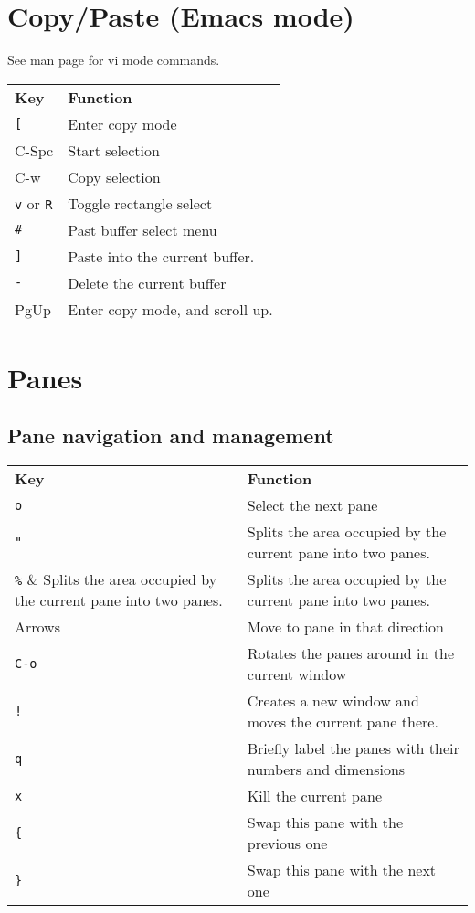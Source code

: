 \documentclass[landscape]{article}
\newcommand{\thead}[1]{{\color{black}\bf#1}}
\newcommand{\blankfirst}{%
  \ifodd\rownum\advance\rownum1\relax\fi}
\begin{document}
\begin{multicols}{3}
  \section*{Copy/Paste (Emacs mode)}
  See man page for vi mode commands.\\
  \blankfirst
  \noindent\begin{tabular}{p{0.6in}p{2.3in}} %
    \thead{Key} & \thead{Function}\\
    \verb|[| & Enter copy mode\\
    C-Spc & Start selection\\
    C-w & Copy selection\\
    \verb|v| or \verb|R| & Toggle rectangle select\\
    \verb|#| & Past buffer select menu\\
    \verb|]| & Paste into the current buffer.\\
    \verb|-| & Delete the current buffer\\
    PgUp &  Enter copy mode, and scroll up.\\
  \end{tabular}

  \section*{Panes}
  \subsection*{\color{gray!80}Pane navigation and management}
  \blankfirst
  \noindent\begin{tabular}{p{0.6in}p{2.3in}} %
    \thead{Key} & \thead{Function}\\
    \verb|o| & Select the next pane\\
    \verb|"| & Splits the area occupied by the current pane into two panes.\\
    \verb|%| & Splits the area occupied by the current pane into two panes.\\
    Arrows & Move to pane in that direction\\
    \verb|C-o| & Rotates the panes around in the current window\\
    \verb|!| & Creates a new window and moves the current pane there.\\
    \verb|q| & Briefly label the panes with their numbers and dimensions\\
    \verb|x| & Kill the current pane\\
    \verb|{| & Swap this pane with the previous one\\
      \verb|}| & Swap this pane with the next one\\
  \end{tabular}

\end{multicols}
\end{document}
